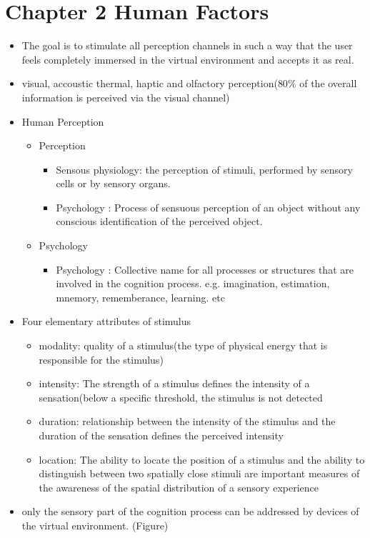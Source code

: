 \documentclass{standalone}
\begin{document}
\section{Chapter 2 Human Factors}
\begin{itemize}
	\item The goal is to stimulate all perception channels in such a way that the user feels completely immersed in the virtual environment and accepts it as real.
	\item visual, accoustic thermal, haptic and olfactory perception($80 \%$ of the overall information is perceived via the visual channel)
	\item Human Perception
	\begin{itemize}
		\item Perception
		\begin{itemize}
			\item Sensous physiology: the perception of stimuli, performed by sensory cells or by sensory organs.
			\item Psychology : Process of sensuous perception of an object without any conscious identification of the perceived object.
		\end{itemize}
		\item Psychology
		\begin{itemize}
			\item Psychology : Collective name for all processes or structures that are involved in the cognition process. e.g. imagination, estimation, mnemory, rememberance, learning. etc
		\end{itemize}
	\end{itemize}
	\item Four elementary attributes of stimulus
	\begin{itemize}
		\item modality: quality of a stimulus(the type of physical energy that is responsible for the stimulus)
		\item intensity: The strength of a stimulus defines the intensity of a sensation(below a specific threshold, the stimulus is not detected
		\item duration: relationship between the intensity of the stimulus and the duration of the sensation defines the perceived intensity
		\item location: The ability to locate the position of a stimulus and the ability to distinguish between two spatially close stimuli are important measures of the awareness of the spatial distribution of a sensory experience
	\end{itemize}
	\item only the sensory part of the cognition process can be addressed by devices of the virtual environment. (Figure)
\end{itemize}
\end{document}
